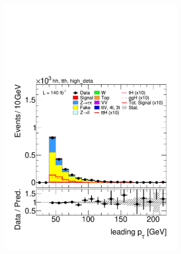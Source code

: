       \begin{figure}[htbp]
        \centering
        \begin{subfigure}[b]{0.45\textwidth}
          \centering
          \includegraphics[width=\textwidth]{images/using_highdeta_ffs_run2_inclusive/plot_tau_0_pt_hh_tth_15_16_17_18_high_deta.pdf}
          \caption{}
        \end{subfigure}
        \hfill
        \begin{subfigure}[b]{0.45\textwidth}
          \centering

\end{subfigure}
\end{figure}
